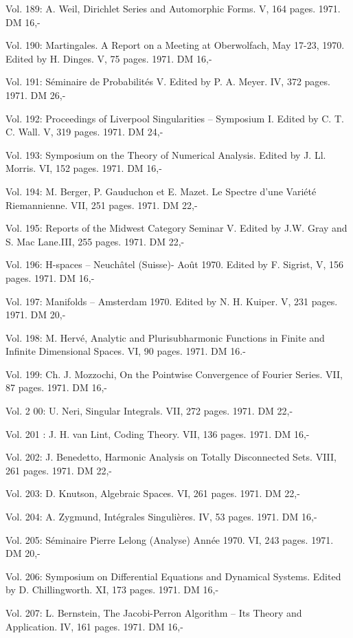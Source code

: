 Vol. 189: A. Weil, Dirichlet Series and Automorphic Forms. V, 164 pages. 1971. DM 16,-

Vol. 190: Martingales. A Report on a Meeting at Oberwolfach, May 17-23, 1970. Edited by H. Dinges. V, 75 pages. 1971. DM 16,-

Vol. 191: Séminaire de Probabilités V. Edited by P. A. Meyer. IV, 372 pages. 1971. DM 26,-

Vol. 192: Proceedings of Liverpool Singularities -- Symposium I. Edited by C. T. C. Wall. V, 319 pages. 1971. DM 24,-

Vol. 193: Symposium on the Theory of Numerical Analysis. Edited by J. Ll. Morris. VI, 152 pages. 1971. DM 16,-

Vol. 194: M. Berger, P. Gauduchon et E. Mazet. Le Spectre d'une Variété Riemannienne. VII, 251 pages. 1971. DM 22,-

Vol. 195: Reports of the Midwest Category Seminar V. Edited by J.W. Gray and S. Mac Lane.III, 255 pages. 1971. DM 22,-

Vol. 196: H-spaces -- Neuchâtel (Suisse)- Août 1970. Edited by F. Sigrist, V, 156 pages. 1971. DM 16,-

Vol. 197: Manifolds -- Amsterdam 1970. Edited by N. H. Kuiper. V, 231 pages. 1971. DM 20,-

Vol. 198: M. Hervé, Analytic and Plurisubharmonic Functions in Finite and Infinite Dimensional Spaces. VI, 90 pages. 1971. DM 16.-

Vol. 199: Ch. J. Mozzochi, On the Pointwise Convergence of Fourier Series. VII, 87 pages. 1971. DM 16,-

Vol. 2 00: U. Neri, Singular Integrals. VII, 272 pages. 1971. DM 22,-

Vol. 201 : J. H. van Lint, Coding Theory. VII, 136 pages. 1971. DM 16,-

Vol. 202: J. Benedetto, Harmonic Analysis on Totally Disconnected Sets. VIII, 261 pages. 1971. DM 22,-

Vol. 203: D. Knutson, Algebraic Spaces. VI, 261 pages. 1971. DM 22,-

Vol. 204: A. Zygmund, Intégrales Singulières. IV, 53 pages. 1971. DM 16,-

Vol. 205: Séminaire Pierre Lelong (Analyse) Année 1970. VI, 243 pages. 1971. DM 20,-

Vol. 206: Symposium on Differential Equations and Dynamical Systems. Edited by D. Chillingworth. XI, 173 pages. 1971. DM 16,-

Vol. 207: L. Bernstein, The Jacobi-Perron Algorithm -- Its Theory and Application. IV, 161 pages. 1971. DM 16,-


